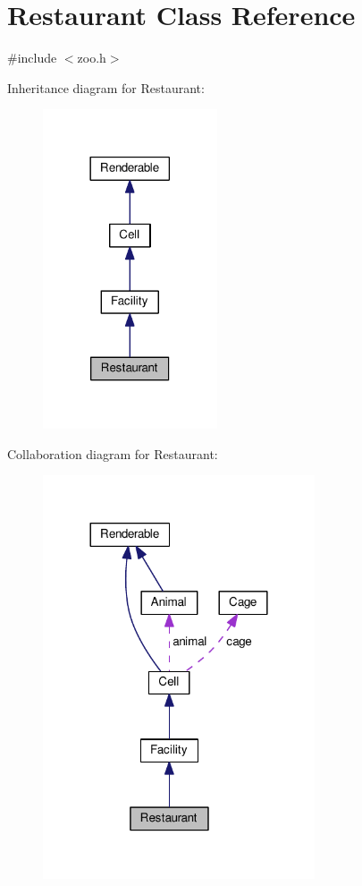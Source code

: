 \hypertarget{classRestaurant}{}\section{Restaurant Class Reference}
\label{classRestaurant}


{\ttfamily \#include $<$zoo.\+h$>$}



Inheritance diagram for Restaurant\+:
\nopagebreak
\begin{figure}[H]
\begin{center}
\leavevmode
\includegraphics[width=146pt]{classRestaurant__inherit__graph}
\end{center}
\end{figure}


Collaboration diagram for Restaurant\+:
\nopagebreak
\begin{figure}[H]
\begin{center}
\leavevmode
\includegraphics[width=228pt]{classRestaurant__coll__graph}
\end{center}
\end{figure}
